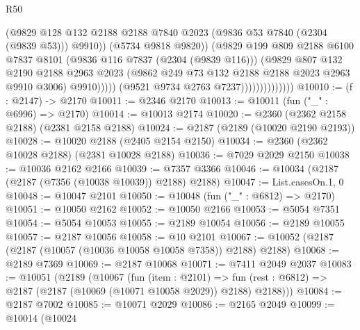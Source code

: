 \begin{lexlean}{R50}
\begin{coremodule}
                                        (@9829
                                          @128
                                          @132
                                          @2188
                                          @2188
                                          @7840
                                          @2023
                                          (@9836 @53 @7840 (@2304 (@9839 @53)))
                                          @9910))
                                      (@5734 @9818 @9820))
                                    (@9829
                                      @199
                                      @809
                                      @2188
                                      @6100
                                      @7837
                                      @8101
                                      (@9836 @116 @7837 (@2304 (@9839 @116)))
                                      (@9829
                                        @807
                                        @132
                                        @2190
                                        @2188
                                        @2963
                                        @2023
                                        (@9862 @249 @73 @132 @2188 @2188 @2023 @2963 @9910 @3006)
                                        @9910)))))
                              (@9521 @9734 @2763 @7237))))))))))))))
@10010 := (f : @2147) -> @2170
@10011 := @2346 @2170
@10013 := @10011 (fun ("_" : @6996) => @2170)
@10014 := @10013 @2174
@10020 := @2360 (@2362 @2158 @2188) (@2381 @2158 @2188)
@10024 := @2187 (@2189 (@10020 @2190 @2193))
@10028 := @10020 @2188 (@2405 @2154 @2150)
@10034 := @2360 (@2362 @10028 @2188) (@2381 @10028 @2188)
@10036 := @7029 @2029 @2150
@10038 := @10036 @2162 @2166
@10039 := @7357 @3366
@10046 := @10034 (@2187 (@2187 (@7356 (@10038 @10039)) @2188) @2188)
@10047 := List.casesOn.{1, 0}
@10048 := @10047 @2101
@10050 := @10048 (fun ("_" : @6812) => @2170)
@10051 := @10050 @2162
@10052 := @10050 @2166
@10053 := @5054 @7351
@10054 := @5054 @10053
@10055 := @2189 @10054
@10056 := @2189 @10055
@10057 := @2187 @10056
@10058 := @10 @2101
@10067 := @10052 (@2187 (@2187 (@10057 (@10036 @10058 @10058 @7358)) @2188) @2188)
@10068 := @2189 @7369
@10069 := @2187 @10068
@10071 := @7411 @2049 @2037
@10083 := @10051
    (@2189
      (@10067
        (fun (item : @2101) =>
        fun (rest : @6812) => @2187 (@2187 (@10069 (@10071 @10058 @2029)) @2188) @2188)))
@10084 := @2187 @7002
@10085 := @10071 @2029
@10086 := @2165 @2049
@10099 := @10014
    (@10024

\end{coremodule}
\end{lexlean}

